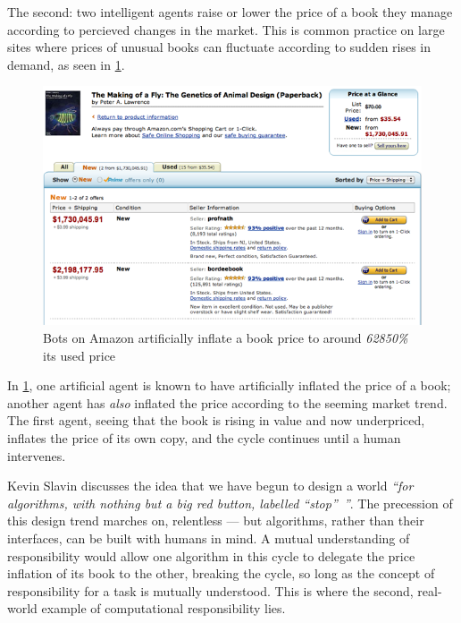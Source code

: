 The second: two intelligent agents raise or lower the price of a book they manage according to percieved changes in the market. This is common practice on large sites where prices of unusual books can fluctuate according to sudden rises in demand, as seen in \cref{fig:amazon_price_hiking}.

\begin{figure}[h]
\label{fig:amazon_price_hiking}
\centering
\includegraphics[trim=0.7cm 0.7cm 0.7cm 0.7cm, scale=0.75]{images/amazon_price_hike_fly_genetics}
\caption{Bots on Amazon artificially inflate a book price to around \emph{62850\%} its used price}
\end{figure}

In \cref{fig:amazon_price_hiking}, one artificial agent is known to have artificially inflated the price of a book; another agent has \emph{also} inflated the price according to the seeming market trend. The first agent, seeing that the book is rising in value and now underpriced, inflates the price of its own copy, and the cycle continues until a human intervenes.\par

Kevin Slavin discusses the idea that we have begun to design a world \emph{``for algorithms, with nothing but a big red button, labelled ``stop''~''}\cite{SlavinHOWWORLD}. The precession of this design trend marches on, relentless --- but algorithms, rather than their interfaces, can be built with humans in mind. A mutual understanding of responsibility would allow one algorithm in this cycle to delegate the price inflation of its book to the other, breaking the cycle, so long as the concept of responsibility for a task is mutually understood. This is where the second, real-world example of computational responsibility lies. \par

